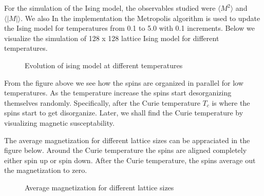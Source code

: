 \documentclass{article}
\begin{document}
For the simulation of the Ising model, the observables studied were $\langle{M^2}\rangle$ and $\langle{\left|M\right|}\rangle$. We also In the
implementation the Metropolis algorithm is used to update the Ising model for temperatures from 0.1 to 5.0 with 0.1 increments. Below we visualize
the simulation of 128 x 128 lattice Ising model for different temperatures.

\begin{figure}[H]
  \begin{center}
  \end{center}
  \caption{Evolution of ising model at different temperatures}
  \label{fig:ising_states}
\end{figure}

From the figure above we see how the spins are organized in parallel for low temperatures. As the temperature increase the spins start desorganizing themselves
randomly. Specifically, after the Curie temperature $T_{c}$ is where the spins start to get disorganize. Later, we shall find the Curie temperature by visualizing
magnetic susceptability.

The average magnetization for different lattice sizes can be appraciated in the figure below. Around the Curie temperature the spins are aligned completely either spin up or spin down. After
the Curie temperature, the spins average out the magnetization to zero.

\begin{figure}[H]
  \begin{center}
  \end{center}
  \caption{Average magnetization for different lattice sizes}
  \label{fig:avg_mag}
\end{figure}
\end{document}
